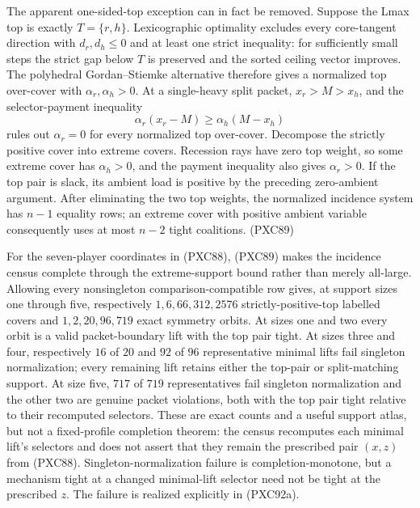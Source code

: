 \documentclass[11pt]{article}
\begin{document}
The apparent one-sided-top exception can in fact be removed.  Suppose the
Lmax top is exactly $T=\{r,h\}$.  Lexicographic optimality excludes every
core-tangent direction with $d_r,d_h\le0$ and at least one strict inequality:
for sufficiently small steps the strict gap below $T$ is preserved and the
sorted ceiling vector improves.  The polyhedral Gordan--Stiemke alternative
therefore gives a normalized top over-cover with
$\alpha_r,\alpha_h>0$.  At a single-heavy split packet,
$x_r>M>x_h$, and the selector-payment inequality
\[
 \alpha_r(x_r-M)\ge\alpha_h(M-x_h)
\]
rules out $\alpha_r=0$ for every normalized top over-cover.  Decompose the
strictly positive cover into extreme covers.  Recession rays have zero top
weight, so some extreme cover has $\alpha_h>0$, and the payment inequality
also gives $\alpha_r>0$.  If the top pair is slack, its ambient load is
positive by the preceding zero-ambient argument.  After eliminating the two
top weights, the normalized incidence system has $n-1$ equality rows; an
extreme cover with positive ambient variable consequently uses at most
$n-2$ tight coalitions.                                      \hfill(PXC89)

For the seven-player coordinates in (PXC88), (PXC89) makes the incidence
census complete through the extreme-support bound rather than merely
all-large.  Allowing every nonsingleton comparison-compatible row gives, at
support sizes one through five,
respectively $1,6,66,312,2576$ strictly-positive-top labelled covers and
$1,2,20,96,719$ exact symmetry orbits.  At sizes one and two every orbit is
a valid packet-boundary lift with the top pair tight.  At sizes three and
four, respectively $16$ of $20$ and $92$ of $96$ representative minimal
lifts fail singleton normalization; every remaining lift retains either the
top-pair or split-matching support.  At size five, $717$ of $719$
representatives fail singleton normalization and the other two are genuine
packet violations, both with the top pair tight relative to their recomputed
selectors.  These are exact counts and a useful support atlas, but not a
fixed-profile completion theorem: the census recomputes each minimal lift's
selectors and does not assert that they remain the prescribed pair $(x,z)$
from (PXC88).  Singleton-normalization failure is completion-monotone, but a
mechanism tight at a changed minimal-lift selector need not be tight at the
prescribed $z$.  The failure is realized explicitly in (PXC92a).
\end{document}
